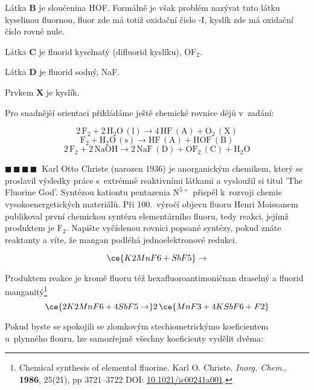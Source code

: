 \documentclass{book}
\newcommand{\ctyri}{$\blacksquare \, \blacksquare \, \blacksquare \, \blacksquare \; \; $}
\renewenvironment{quotation}{\par}{\par} %
\begin{document}
Látka \textbf{B }je sloučenina HOF. Formálně je však problém nazývat
tuto látku kyselinou fluornou, fluor zde má totiž oxidační číslo -I,
kyslík zde má oxidační číslo rovné nule.

Látka \textbf{C }je fluorid kyselnatý (difluorid kyslíku), OF$_{2}$.

Látka \textbf{D} je fluorid sodný, NaF.

Prvkem \textbf{X} je kyslík.

Pro snadnější orientaci přikládáme ještě chemické rovnice dějů v~zadání:

\[
\mathrm{2\,F_{2}+2\,H_{2}O\,(l)\rightarrow4\,HF\,(\mathrm{\boldsymbol{\mathrm{A}}})+O_{2}\,(\boldsymbol{\mathrm{X}})}
\]
\[
\mathrm{F_{2}+H_{2}O\,(s)\rightarrow HF\,(\mathrm{\boldsymbol{\mathrm{A}}})+HOF\,(\mathrm{\boldsymbol{\mathrm{B}}})}
\]
\[
\mathrm{2\,F_{2}+2\,NaOH\rightarrow2\,NaF\,(\mathrm{\boldsymbol{\mathrm{D}}})+OF_{2}\,(\mathrm{\boldsymbol{\mathrm{C}}})+H_{2}O}
\]


\hrulefill %
\begin{quotation}
\ctyri Karl Otto Christe (narozen 1936) je anorganickým chemikem, který se
proslavil výsledky práce s~extrémně reaktivními látkami a vysloužil
si titul 'The Fluorine God'. Syntézou kationtu pentazenia $\mathrm{N}^{5+}$ 
přispěl k~rozvoji chemie vysokoenergetických
materiálů. Při 100.~výročí objevu fluoru Henri Moissanem publikoval
první chemickou syntézu elementárního fluoru, tedy reakci, jejímž
produktem je $\mathrm{F}_{2}$. Napište vyčíslenou rovnici popsané
syntézy, pokud znáte reaktanty a víte, že mangan podléhá jednoelektronové
redukci.

\[
\ce{K2MnF6 +SbF5} \rightarrow
\]

\end{quotation} \dotfill \par 
Produktem reakce je kromě fluoru též hexafluoroantimoničnan draselný a fluorid manganitý\footnote{Chemical synthesis of elemental fluorine. Karl O. Christe. \textit{Inorg. Chem.},
\textbf{1986}, 25(21), pp 3721--3722 DOI: \href{https://doi.org/10.1021/ic00241a001}{\underline{10.1021/ic00241a001}}.
}
\[
\ce{2 K2MnF6 + 4 SbF5 \rightarrow} 2\, \ce{MnF3 + 4 KSbF6 +F2}
\]

Pokud byste se spokojili se zlomkovým stechiometrickýmo koeficientem u~plynného flouru, lze samozřejmě všechny koeficienty vydělit dvěma:
\end{document}
